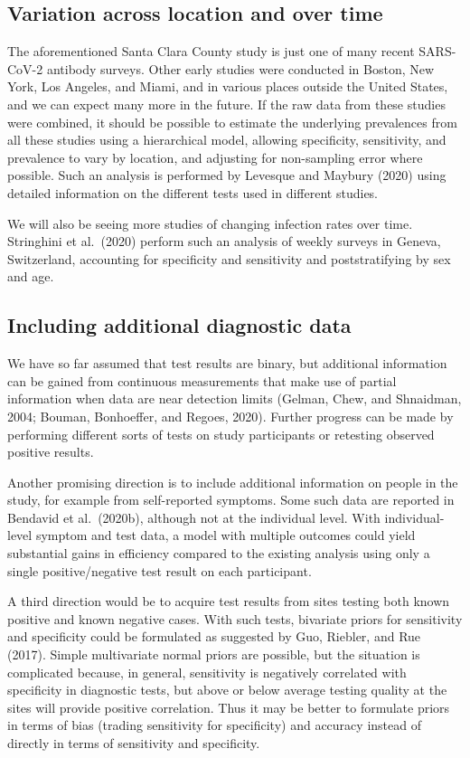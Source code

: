 \documentclass[11pt]{article}
\begin{document}
\subsection{Variation across location and over time}\label{muiltiple}

The aforementioned Santa Clara County study is just one of many recent
SARS-CoV-2 antibody surveys.  Other early studies were conducted in
Boston, New York, Los Angeles, and Miami, and in various places
outside the United States, and we can expect many more in the future.
If the raw data from these studies were combined, it should be
possible to estimate the underlying prevalences from all these studies
using a hierarchical model, allowing specificity, sensitivity, and
prevalence to vary by location, and adjusting for non-sampling error
where possible.  Such an analysis is performed by Levesque and Maybury
(2020) using detailed information on the different tests used in
different studies.

We will also be seeing more studies of changing infection rates over
time.  Stringhini et al.\ (2020) perform such an analysis of weekly
surveys in Geneva, Switzerland, accounting for specificity and
sensitivity and poststratifying by sex and age.

\subsection{Including additional diagnostic data}

We have so far assumed that test results are binary, but additional
information can be gained from continuous measurements that make use
of partial information when data are near detection limits (Gelman,
Chew, and Shnaidman, 2004; Bouman, Bonhoeffer, and Regoes, 2020).
Further progress can be made by performing different sorts of tests on
study participants or retesting observed positive results.

Another promising direction is to include additional information on
people in the study, for example from self-reported symptoms.  Some
such data are reported in Bendavid et al.\ (2020b), although not at
the individual level. With individual-level symptom and test data, a
model with multiple outcomes could yield substantial gains in
efficiency compared to the existing analysis using only a single
positive/negative test result on each participant.

A third direction would be to acquire test results from sites testing
both known positive and known negative cases.  With such tests,
bivariate priors for sensitivity and specificity could be formulated
as suggested by Guo, Riebler, and Rue (2017).  Simple multivariate
normal priors are possible, but the situation is complicated because,
in general, sensitivity is negatively correlated with specificity in
diagnostic tests, but above or below average testing quality at the
sites will provide positive correlation.  Thus it may be better to
formulate priors in terms of bias (trading sensitivity for
specificity) and accuracy instead of directly in terms of sensitivity
and specificity.
\end{document}
